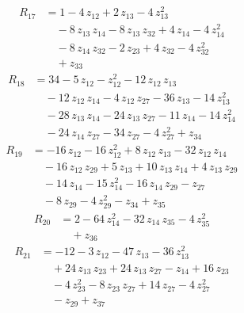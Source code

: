 \begin{equation*}\begin{aligned}
R_{17}&=1 -4\,z_{12} +2\,z_{13} -4\,z_{13}^{2} \\
&\quad -8\,z_{13}\,z_{14} -8\,z_{13}\,z_{32} +4\,z_{14} -4\,z_{14}^{2} \\
&\quad -8\,z_{14}\,z_{32} -2\,z_{23} +4\,z_{32} -4\,z_{32}^{2} \\
&\quad +z_{33}
\end{aligned}\end{equation*}
\begin{equation*}\begin{aligned}
R_{18}&=34 -5\,z_{12} -z_{12}^{2} -12\,z_{12}\,z_{13} \\
&\quad -12\,z_{12}\,z_{14} -4\,z_{12}\,z_{27} -36\,z_{13} -14\,z_{13}^{2} \\
&\quad -28\,z_{13}\,z_{14} -24\,z_{13}\,z_{27} -11\,z_{14} -14\,z_{14}^{2} \\
&\quad -24\,z_{14}\,z_{27} -34\,z_{27} -4\,z_{27}^{2} +z_{34}
\end{aligned}\end{equation*}
\begin{equation*}\begin{aligned}
R_{19}&=-16\,z_{12} -16\,z_{12}^{2} +8\,z_{12}\,z_{13} -32\,z_{12}\,z_{14} \\
&\quad -16\,z_{12}\,z_{29} +5\,z_{13} +10\,z_{13}\,z_{14} +4\,z_{13}\,z_{29} \\
&\quad -14\,z_{14} -15\,z_{14}^{2} -16\,z_{14}\,z_{29} -z_{27} \\
&\quad -8\,z_{29} -4\,z_{29}^{2} -z_{34} +z_{35}
\end{aligned}\end{equation*}
\begin{equation*}\begin{aligned}
R_{20}&=2 -64\,z_{14}^{2} -32\,z_{14}\,z_{35} -4\,z_{35}^{2} \\
&\quad +z_{36}
\end{aligned}\end{equation*}
\begin{equation*}\begin{aligned}
R_{21}&=-12 -3\,z_{12} -47\,z_{13} -36\,z_{13}^{2} \\
&\quad +24\,z_{13}\,z_{23} +24\,z_{13}\,z_{27} -z_{14} +16\,z_{23} \\
&\quad -4\,z_{23}^{2} -8\,z_{23}\,z_{27} +14\,z_{27} -4\,z_{27}^{2} \\
&\quad -z_{29} +z_{37}
\end{aligned}\end{equation*}
